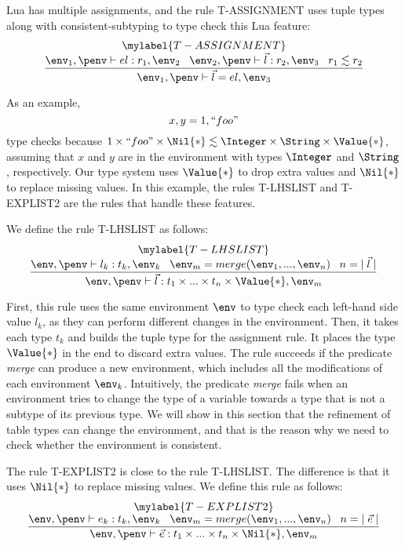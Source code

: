 Lua has multiple assignments, and the rule \textsc{T-ASSIGNMENT} uses
tuple types along with consistent-subtyping to type check this Lua feature:
\[
\begin{array}{c}
\mylabel{T-ASSIGNMENT}\\
\begin{array}{c}
\dfrac{\env_{1}, \penv \vdash el:r_{1}, \env_{2} \;\;\;
       \env_{2}, \penv \vdash \vec{l}:r_{2}, \env_{3} \;\;\;
       r_{1} \lesssim r_{2}}
      {\env_{1}, \penv \vdash \vec{l} = el,\env_{3}}
\end{array}
\end{array}
\]

As an example,
\[
x, y = 1, ``foo"
\]
type checks because
$1 \times ``foo" \times \Nil{*} \lesssim \Integer \times \String \times \Value{*}$,
assuming that $x$ and $y$ are in the environment with
types $\Integer$ and $\String$, respectively.
Our type system uses $\Value{*}$ to drop extra values
and $\Nil{*}$ to replace missing values.
In this example, the rules \textsc{T-LHSLIST} and \textsc{T-EXPLIST2}
are the rules that handle these features.

We define the rule \textsc{T-LHSLIST} as follows:
\[
\begin{array}{c}
\mylabel{T-LHSLIST}\\
\dfrac{\env, \penv \vdash l_{k}:t_{k}, \env_{k} \;\;\;
       \env_{m} = merge(\env_{1}, ..., \env_{n}) \;\;\;
       n = |\;\vec{l}\;|}
      {\env, \penv \vdash \vec{l}:t_{1} \times ... \times t_{n} \times \Value{*}, \env_{m}}
\end{array}
\]

First, this rule uses the same environment $\env$ to type check each
left-hand side value $l_{k}$, as they can perform different changes
in the environment.
Then, it takes each type $t_{k}$ and builds the tuple type for
the assignment rule.
It places the type $\Value{*}$ in the end to discard extra values.
The rule succeeds if the predicate \emph{merge} can
produce a new environment, which includes all the modifications
of each environment $\env_{k}$.
Intuitively, the predicate \emph{merge} fails when an environment
tries to change the type of a variable towards a type that is not
a subtype of its previous type.
We will show in this section that the refinement of table types can
change the environment, and that is the reason why we need to check
whether the environment is consistent.

The rule \textsc{T-EXPLIST2} is close to the rule \textsc{T-LHSLIST}.
The difference is that it uses $\Nil{*}$ to replace missing values.
We define this rule as follows:
\[
\begin{array}{c}
\mylabel{T-EXPLIST2}\\
\dfrac{\env, \penv \vdash e_{k}:t_{k}, \env_{k} \;\;\;
       \env_{m} = merge(\env_{1}, ..., \env_{n}) \;\;\;
       n = |\;\vec{e}\;|}
      {\env, \penv \vdash \vec{e}:t_{1} \times ... \times t_{n} \times \Nil{*}, \env_{m}}
\end{array}
\]

